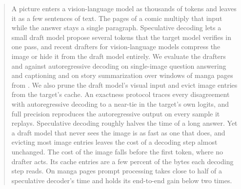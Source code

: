 \begin{abstract}
A picture enters a vision-language model as thousands of tokens and leaves it as a few sentences of text.
The pages of a comic multiply that input while the answer stays a single paragraph.
Speculative decoding lets a small draft model propose several tokens that the target model verifies in one pass, and recent drafters for vision-language models compress the image or hide it from the draft model entirely.
We evaluate the drafters \vispec and \hivis against autoregressive decoding on single-image question answering and captioning and on story summarization over windows of manga pages from \rvp.
We also prune the draft model's visual input and evict image entries from the target's cache.
An exactness protocol traces every disagreement with autoregressive decoding to a near-tie in the target's own logits, and full precision reproduces the autoregressive output on every sample it replays.
Speculative decoding roughly halves the time of a long answer.
Yet a draft model that never sees the image is as fast as one that does, and evicting most image entries leaves the cost of a decoding step almost unchanged.
The cost of the image falls before the first token, where no drafter acts.
Its cache entries are a few percent of the bytes each decoding step reads.
On manga pages prompt processing takes close to half of a speculative decoder's time and holds its end-to-end gain below two times.
\end{abstract}
